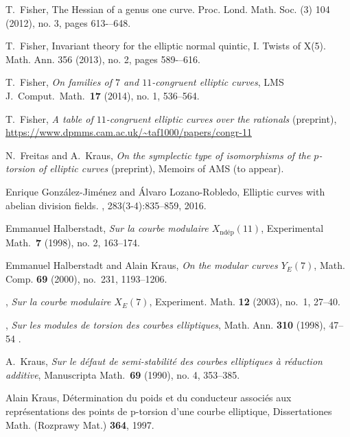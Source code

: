 \documentclass[12pt, reqno]{amsart}
\numberwithin{equation}{section}
\theoremstyle{definition}
\theoremstyle{remark}
\begin{document}
\begin{thebibliography}{999}
 T.\ Fisher,
  \newblock The Hessian of a genus one curve.
  \newblock Proc. Lond. Math. Soc. (3) 104 (2012),
  no. 3, pages 613-–648.

 T.\ Fisher,
\newblock Invariant theory for the elliptic normal quintic, I. Twists
of X(5).
\newblock Math. Ann. 356 (2013), no. 2, pages 589-–616.

 T.\ Fisher,
{\em On families of $7$ and $11$-congruent elliptic curves}, 
LMS J.\ Comput.\ Math.\ {\bf 17} (2014), no. 1, 536--564.

 T.\ Fisher,
{\em A table of $11$-congruent elliptic curves over the rationals} (preprint), \\
\url{https://www.dpmms.cam.ac.uk/~taf1000/papers/congr-11}

 N.\ Freitas and A.\ Kraus, {\em On the symplectic type
  of isomorphisms of the $p$-torsion of elliptic curves} (preprint),
  Memoirs of AMS (to appear).

Enrique Gonz\'{a}lez-Jim\'{e}nez and \'{A}lvaro Lozano-Robledo,
\newblock Elliptic curves with abelian division fields.
, 283(3-4):835--859, 2016.

 Emmanuel Halberstadt, \emph{Sur la
  courbe modulaire {$X_{\text{nd\'ep}}(11)$}}, Experimental
  Math.\ \textbf{7} (1998), no. 2, 163--174.

Emmanuel Halberstadt and Alain Kraus, \emph{On the modular curves {$Y_E(7)$}},
  Math. Comp. \textbf{69} (2000), no.~231, 1193--1206. 

\bysame, \emph{Sur la courbe modulaire {$X_E(7)$}}, Experiment. Math.
  {\bf 12} (2003), no.~1, 27--40. 
  
\bysame, \emph{Sur les modules de torsion des courbes elliptiques}, 
Math. Ann. {\bf 310} (1998), 47--54 .

 A.\ Kraus,
{\em Sur le d\'efaut de semi-stabilit\'e des courbes elliptiques \`a r\'eduction additive},
Manuscripta Math.\ {\bf 69} (1990), no. 4, 353--385.
  
Alain Kraus,
\newblock D{\'e}termination du poids et du conducteur associ{\'e}s aux repr{\'e}sentations des points de p-torsion d'une courbe elliptique,
\newblock Dissertationes Math. (Rozprawy Mat.) {\bf 364}, 1997.


\end{thebibliography}
\end{document}
